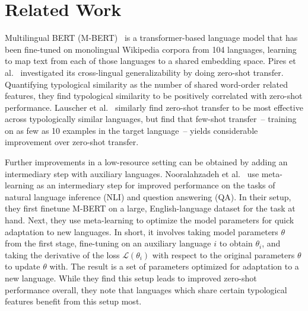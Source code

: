
\section{Related Work}

Multilingual BERT (M-BERT)~\cite{devlin-etal-2019-bert} is a transformer-based language model that has been fine-tuned on monolingual Wikipedia corpora from 104 languages, learning to map text from each of those languages to a shared embedding space. Pires et al.~\cite{pires-etal-2019-multilingual} investigated its cross-lingual generalizability by doing zero-shot transfer. Quantifying typological similarity as the number of shared word-order related features, they find typological similarity to be positively correlated with zero-shot performance. Lauscher et al.~\cite{lauscher-etal-2020-zero} similarly find zero-shot transfer to be most effective across typologically similar languages, but find that few-shot transfer~-- training on as few as 10 examples in the target language~-- yields considerable improvement over zero-shot transfer.

Further improvements in a low-resource setting can be obtained by adding an intermediary step with auxiliary languages. Nooralahzadeh et al.~\cite{nooralahzadeh-etal-2020-zero} use meta-learning as an intermediary step for improved performance on the tasks of natural language inference (NLI) and question answering (QA). In their setup, they first finetune M-BERT on a large, English-language dataset for the task at hand. Next, they use meta-learning to optimize the model parameters for quick adaptation to new languages. In short, it involves taking model parameters $\theta$ from the first stage, fine-tuning on an auxiliary language $i$ to obtain $\theta_i$, and taking the derivative of the loss $\mathcal{L}(\theta_i)$ with respect to the original parameters $\theta$ to update $\theta$ with. The result is a set of parameters optimized for adaptation to a new language. While they find this setup leads to improved zero-shot performance overall, they note that languages which share certain typological features benefit from this setup most.

